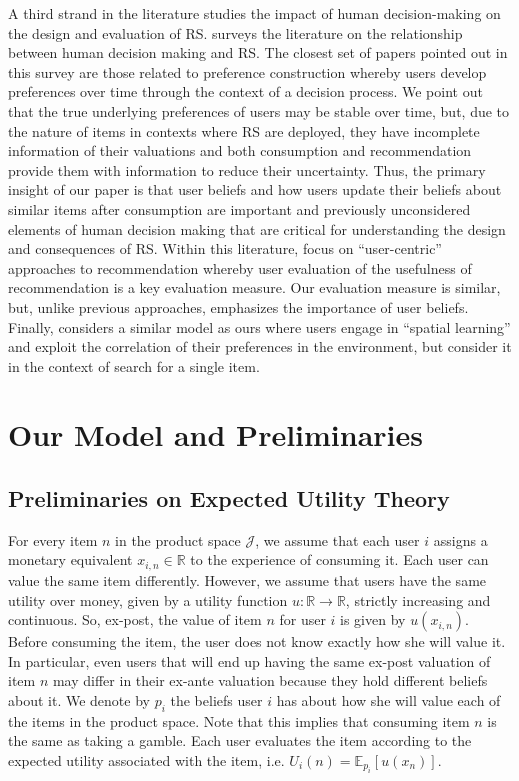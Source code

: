 \documentclass[sigconf]{acmart}
\begin{document}
A third strand in the literature studies the impact of human decision-making on the design and evaluation of RS. \cite{chen2013human} surveys the literature on the relationship between human decision making and RS. The closest set of papers pointed out in this survey are those related to preference construction \cite{bettman1998constructive, lichtenstein2006construction} whereby users develop preferences over time through the context of a decision process. We point out that the true underlying preferences of users may be stable over time, but, due to the nature of items in contexts where RS are deployed, they have incomplete information of their valuations and both consumption and recommendation provide them with information to reduce their uncertainty. Thus, the primary insight of our paper is that user beliefs and how users update their beliefs about similar items after consumption are important and previously unconsidered elements of human decision making that are critical for understanding the design and consequences of RS. Within this literature, \cite{celma2008new, cremonesi2013user, pu2011user} focus on ``user-centric'' approaches to recommendation whereby user evaluation of the usefulness of recommendation is a key evaluation measure. Our evaluation measure is similar, but, unlike previous approaches, emphasizes the importance of user beliefs. Finally, \cite{hodgson2019horse} considers a similar model as ours where users engage in ``spatial learning'' and exploit the correlation of their preferences in the environment, but consider it in the context of search for a single item.

\section{Our Model and Preliminaries}
\subsection{Preliminaries on Expected Utility Theory}
\noindent For every item $n$ in the product space $\mathcal J$, we assume that each user $i$ assigns a monetary equivalent $x_{i,n} \in \mathbb R$ to the experience of consuming it. Each user can value the same item differently. However, we assume that users have the same utility over money, given by a utility function $u: \mathbb R \to \mathbb R$, strictly increasing and continuous. So, ex-post, the value of item $n$ for user $i$ is given by $u(x_{i,n})$. Before consuming the item, the user does not know exactly how she will value it. In particular, even users that will end up having the same ex-post valuation of item $n$ may differ in their ex-ante valuation because they hold different beliefs about it. We denote by $p_{i}$ the beliefs user $i$ has about how she will value each of the items in the product space. Note that this implies that consuming item $n$ is the same as taking a gamble. Each user evaluates the item according to the expected utility associated with the item, i.e. $U_i(n)=\mathbb E_{p_i}[u(x_n)]$. 
\end{document}
